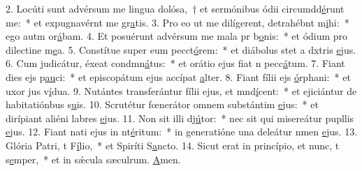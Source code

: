 2. Locúti sunt advérsum me lingua dolósa,~† et sermónibus ódii circumdd\uline{é}runt me:~* et expugnavérnt me gr\uline{a}tis.
3. Pro eo ut me dilígerent, detrahébnt m\uline{i}hi:~* ego autm or\uline{á}bam.
4. Et posuérunt advérsum me mala pr b\uline{o}nis:~* et ódium pro dilectine m\uline{e}a.
5. Constítue super eum pecct\uline{ó}rem:~* et diábolus stet a dxtris \uline{e}jus.
6. Cum judicátur, éxeat condmn\uline{á}tus:~* et orátio ejus fiat n pecc\uline{á}tum.
7. Fiant dies ejs p\uline{au}ci:~* et episcopátum ejus accípat \uline{a}lter.
8. Fiant fílii ejs \uline{ó}rphani:~* et uxor jus v\uline{í}dua.
9. Nutántes transferántur fílii ejus, et mnd\uline{í}cent:~* et ejiciántur de habitatiónbus s\uline{u}is.
10. Scrutétur fœnerátor omnem substántim \uline{e}jus:~* et dirípiant aliéni labres \uline{e}jus.
11. Non sit illi dj\uline{ú}tor:~* nec sit qui misereátur pupllis \uline{e}jus.
12. Fiant nati ejus in nt\uline{é}ritum:~* in generatióne una deleátur nmen \uline{e}jus.
13. Glória Patri, t F\uline{í}lio,~* et Spiríti S\uline{a}ncto.
14. Sicut erat in princípio, et nunc, t s\uline{e}mper,~* et in sǽcula sæculrum. \uline{A}men.

